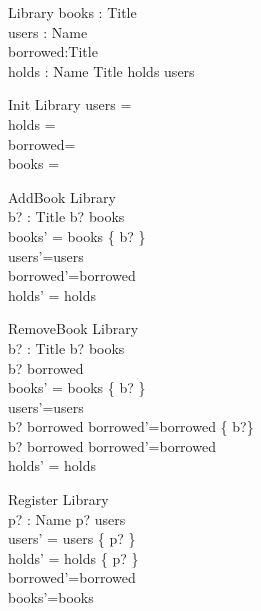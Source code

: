 

\begin{zed}
\end{zed}

\begin{schema}{Library}
 books : \power Title \\
 users : \power Name \\
 borrowed:\power Title\\
 holds : Name \pfun \power Title 
\where
 \dom holds \subseteq users
\end{schema}

\begin{schema}{Init}
 Library
\where
 users =~\emptyset \\
 holds =~\emptyset \\
 borrowed=~\emptyset \\
 books =~\emptyset
\end{schema}

\begin{schema}{AddBook}
 \Delta Library \\
 b? : Title 
\where
 b? \notin books \\
 books' = books \cup \{ b? \} \\
 users'=users\\
 borrowed'=borrowed\\
 holds' = holds
\end{schema}

\begin{schema}{RemoveBook}
 \Delta Library \\
 b? : Title 
\where
 b? \in books \\
 b? \notin borrowed \\
 books' = books \setminus \{ b? \} \\
 users'=users\\
 b? \in borrowed \implies borrowed'=borrowed \setminus\{ b?\}\\
 b? \notin borrowed \implies borrowed'=borrowed \\
 holds' = holds
\end{schema}

\begin{schema}{Register}
 \Delta Library \\
 p? : Name 
\where
 p? \notin users \\
 users' = users \cup \{ p? \} \\
 holds' = holds \cup \{ p? \mapsto \emptyset \}\\
 borrowed'=borrowed\\
 books'=books
\end{schema}

